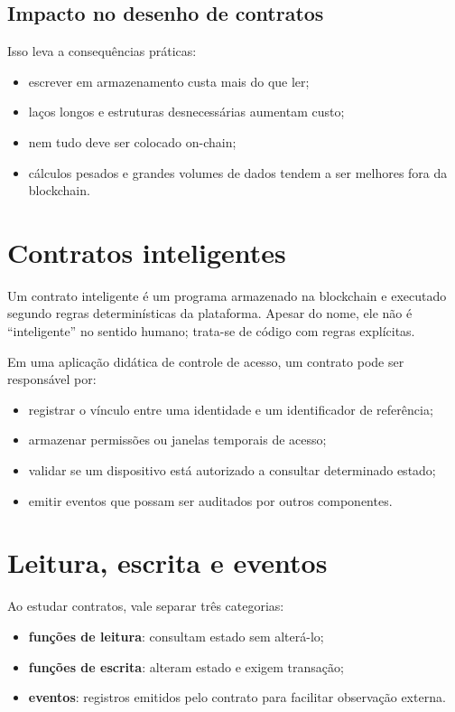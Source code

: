 \subsection{Impacto no desenho de contratos}
Isso leva a consequências práticas:
\begin{itemize}[leftmargin=*]
  \item escrever em armazenamento custa mais do que ler;
  \item laços longos e estruturas desnecessárias aumentam custo;
  \item nem tudo deve ser colocado on-chain;
  \item cálculos pesados e grandes volumes de dados tendem a ser melhores fora da blockchain.
\end{itemize}

\section{Contratos inteligentes}
Um contrato inteligente é um programa armazenado na blockchain e executado segundo regras determinísticas da plataforma. Apesar do nome, ele não é ``inteligente'' no sentido humano; trata-se de código com regras explícitas.

Em uma aplicação didática de controle de acesso, um contrato pode ser responsável por:
\begin{itemize}[leftmargin=*]
  \item registrar o vínculo entre uma identidade e um identificador de referência;
  \item armazenar permissões ou janelas temporais de acesso;
  \item validar se um dispositivo está autorizado a consultar determinado estado;
  \item emitir eventos que possam ser auditados por outros componentes.
\end{itemize}

\section{Leitura, escrita e eventos}
Ao estudar contratos, vale separar três categorias:
\begin{itemize}[leftmargin=*]
  \item \textbf{funções de leitura}: consultam estado sem alterá-lo;
  \item \textbf{funções de escrita}: alteram estado e exigem transação;
  \item \textbf{eventos}: registros emitidos pelo contrato para facilitar observação externa.
\end{itemize}

